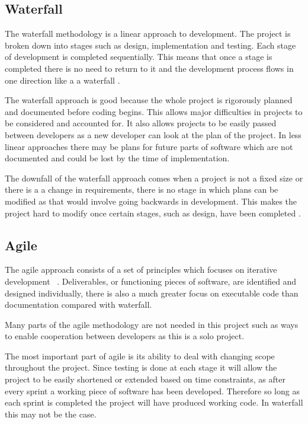 \documentclass{UoYCSproject}
\begin{document}
\subsection{Waterfall}
The waterfall methodology is a linear approach to development. The project is broken down into stages such as design, implementation and testing. Each stage of development is completed sequentially. This means that once a stage is completed there is no need to return to it and the development process flows in one direction like a a waterfall \parencite{royce1987managing}.

The waterfall approach is good because the whole project is rigorously planned and documented before coding begins. This allows major difficulties in projects to be considered and accounted for. It also allows projects to be easily passed between developers as a new developer can look at the plan of the project. In less linear approaches there may be plans for future parts of software which are not documented and could be lost by the time of implementation.

The downfall of the waterfall approach comes when a project is not a fixed size or there is a a change in requirements, there is no stage in which plans can be modified as that would involve going backwards in development. This makes the project hard to modify once certain stages, such as design, have been completed .


\subsection{Agile}
The agile approach consists of a set of principles which focuses on iterative development ~\parencite{beck2001agile}. Deliverables, or functioning pieces of software, are identified and designed individually, there is also a much greater focus on executable code than documentation compared with waterfall.

Many parts of the agile methodology are not needed in this project such as ways to enable cooperation between developers as this is a solo project.

The most important part of agile is its ability to deal with changing scope throughout the project. Since testing is done at each stage it will allow the project to be easily shortened or extended based on time constraints, as after every sprint a working piece of software has been developed. Therefore so long as each sprint is completed the project will have produced working code. In waterfall this may not be the case.
\end{document}
